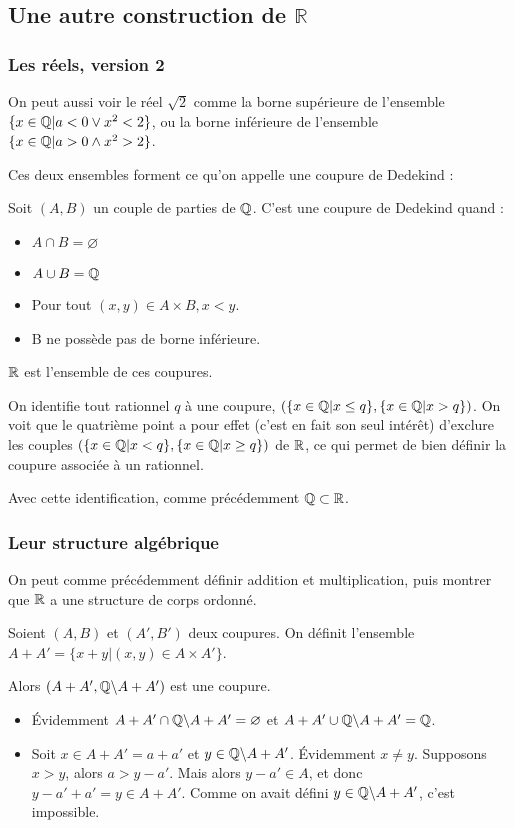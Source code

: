 \subsection{Une autre construction de \texorpdfstring{$\mathbb{R}$}{R}}
\subsubsection{Les réels, version 2}

On peut aussi voir le réel $\sqrt{2}$ comme la borne supérieure de l'ensemble $\{x\in \mathbb{Q} | a<0 \lor x^2<2\}$, ou la borne inférieure de l'ensemble $\{x\in \mathbb{Q} | a>0 \land x^2>2\}$.

Ces deux ensembles forment ce qu'on appelle une coupure de Dedekind :
\begin{defini}
    Soit $(A, B)$ un couple de parties de $\mathbb{Q}$. C'est une coupure de Dedekind quand :
    \begin{itemize}
        \item $A\cap B = \varnothing$
        \item $A\cup B = \mathbb{Q}$
        \item Pour tout $(x,y) \in A\times B, x<y$.
        \item B ne possède pas de borne inférieure. 
    \end{itemize}
\end{defini}

$\mathbb{R}$ est l'ensemble de ces coupures.

On identifie tout rationnel $q$ à une coupure, $(\{x\in \mathbb{Q} | x \leq q\}, \{x\in \mathbb{Q} | x > q\})$. On voit que le quatrième point a pour effet (c'est en fait son seul intérêt) d'exclure les couples $(\{x\in \mathbb{Q} | x < q\}, \{x\in \mathbb{Q} | x  \geq q\})$ de $\mathbb{R}$, ce qui permet de bien définir la coupure associée à un rationnel.

Avec cette identification, comme précédemment $\mathbb{Q} \subset \mathbb{R}$.

\subsubsection{Leur structure algébrique}

On peut comme précédemment définir addition et multiplication, puis montrer que $\mathbb{R}$ a une structure de corps ordonné.

\begin{defini}[Addition]
    Soient $(A, B)$ et $(A', B')$ deux coupures. On définit l'ensemble $A+A'=\{x+y | (x,y) \in A \times A'\}$.
    
    Alors $(A+A', \mathbb{Q}\backslash A+A')$ est une coupure.
    \tcblower
    \begin{itemize}
        \item Évidemment $A+A'\cap \mathbb{Q}\backslash A+A'=\varnothing$ et $A+A'\cup \mathbb{Q}\backslash A+A'=\mathbb{Q}$.
        \item Soit $x\in A+A'=a+a'$ et $y\in\mathbb{Q}\backslash A+A'$. Évidemment $x\neq y$. Supposons $x>y$, alors $a>y-a'$. Mais alors $y-a' \in A$, et donc $y-a'+a'=y\in A+A'$. Comme on avait défini $y\in\mathbb{Q}\backslash A+A'$, c'est impossible.
    \end{itemize}
\end{defini}

